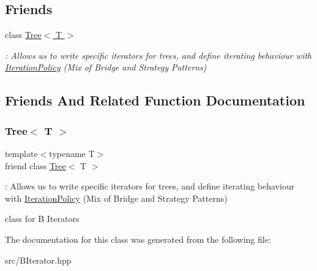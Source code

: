 \subsection*{Friends}
\begin{DoxyCompactItemize}
\item 
class \hyperlink{classBIterator_a151ca71f2c751d8a163f3f99ccf6cec9}{Tree$<$ T $>$}
\begin{DoxyCompactList}\small\item\em \+: Allows us to write specific iterators for trees, and define iterating behaviour with \hyperlink{classIterationPolicy}{Iteration\+Policy} (Mix of Bridge and Strategy Patterns) \end{DoxyCompactList}\end{DoxyCompactItemize}


\subsection{Friends And Related Function Documentation}
\mbox{\label{classBIterator_a151ca71f2c751d8a163f3f99ccf6cec9}} 
\subsubsection{\texorpdfstring{Tree$<$ T $>$}{Tree< T >}}
{\footnotesize\ttfamily template$<$typename T$>$ \\
friend class \hyperlink{classTree}{Tree}$<$ T $>$\hspace{0.3cm}{\ttfamily [friend]}}



\+: Allows us to write specific iterators for trees, and define iterating behaviour with \hyperlink{classIterationPolicy}{Iteration\+Policy} (Mix of Bridge and Strategy Patterns) 

class for B Iterators 

The documentation for this class was generated from the following file\+:\begin{DoxyCompactItemize}
\item 
src/B\+Iterator.\+hpp\end{DoxyCompactItemize}

